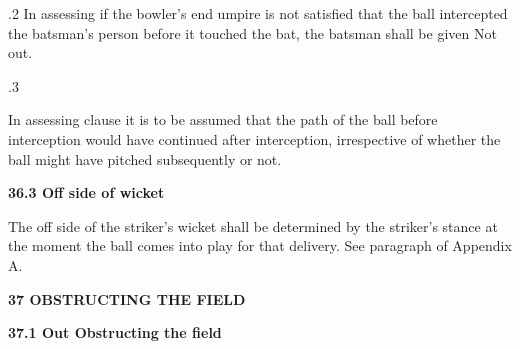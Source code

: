 \documentclass[12pt]{article}
\begin{document}
\vspace{\baselineskip}
\begin{adjustwidth}{0.5in}{0.04in}
{\fontsize{9pt}{10.8pt}.2 \tabto{0.49in} In assessing if the bowler’s end umpire is not satisfied that the ball intercepted the batsman’s person before it touched the bat, the batsman shall be given Not out.\par}\par

\end{adjustwidth}


\vspace{\baselineskip}
\begin{adjustwidth}{0.5in}{0.38in}
{\fontsize{9pt}{10.8pt}.3 \tabto{0.49in} {\fontsize{8pt}{9.6pt}\selectfont In assessing clause it is to be assumed that the path of the ball before interception would have continued after interception, irrespective of whether the ball might have pitched subsequently or not.\par}\par}\par

\end{adjustwidth}


\vspace{\baselineskip}
{\fontsize{11pt}{13.2pt}\selectfont \textbf{36.3 \tabto{0.47in} Off side of wicket}\par}\par


\vspace{\baselineskip}
\begin{adjustwidth}{0.0in}{0.11in}
{\fontsize{9pt}{10.8pt}\selectfont The off side of the striker’s wicket shall be determined by the striker’s stance at the moment the ball comes into play for that delivery. See paragraph of Appendix A.\par}\par

\end{adjustwidth}


\vspace{\baselineskip}
{\fontsize{16pt}{19.2pt}\selectfont \textbf{37 OBSTRUCTING THE FIELD}\par}\par


\vspace{\baselineskip}
{\fontsize{11pt}{13.2pt}\selectfont \textbf{37.1 \tabto{0.47in} Out Obstructing the field}\par}\par
\end{document}
